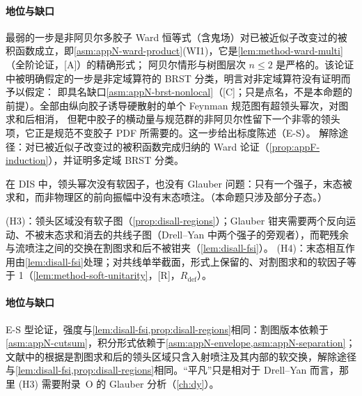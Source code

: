 \paragraph{地位与缺口}
最弱的一步是非阿贝尔多胶子 Ward 恒等式（含鬼场）对已被近似子改变过的被积函数成立，即\cref{asm:appN-ward-product}(WI1)，它是\cref{lem:method-ward-multi}（全阶论证，[A]）的精确形式；
阿贝尔情形与树图层次 $n\le2$ 是严格的。该论证中被明确假定的一步是非定域算符的 BRST 分类，\cite[第~11.3.2~节，第~407--410~页]{Collins2011}明言对非定域算符没有证明而予以假定：
即具名缺口\cref{asm:appN-brst-nonlocal}（[C]；只是点名，不是本命题的前提）。全部由纵向胶子诱导硬散射的单个 Feynman 规范图有超领头幂次，对图求和后相消，
但靶中胶子的横动量与规范群的非阿贝尔性留下一个非零的领头项，它正是规范不变胶子 PDF 所需要的\cite{Collins:2008sg}。这一步给出标度陈述（E-S）。
解除途径：对已被近似子改变过的被积函数完成归纳的 Ward 论证（\cref{prop:appF-induction}），并证明多定域 BRST 分类。

\begin{proposition}\label{prop:disall-h3h4}
在 DIS 中，领头幂次没有软因子，也没有 Glauber 问题：只有一个强子，末态被求和，而非物理区的前向振幅中没有末态喷注。（本命题只涉及部分子态。）
\end{proposition}

\begin{proofsketch}
(H3)：领头区域没有软子图（\cref{prop:disall-regions}）；Glauber 钳夹需要两个反向运动、不被末态求和消去的共线子图（Drell--Yan 中两个强子的旁观者），而靶残余与流喷注之间的交换在割图求和后不被钳夹（\cref{lem:disall-fsi}）。
(H4)：末态相互作用由\cref{lem:disall-fsi}处理；对共线单举截面，形式上保留的、对割图求和的软因子等于 1（\cref{lem:method-soft-unitarity}，[R]，$R_{\mathrm{def}}$）。
\end{proofsketch}

\paragraph{地位与缺口}
E-S 型论证，强度与\cref{lem:disall-fsi,prop:disall-regions}相同：割图版本依赖于\cref{asm:appN-cutsum}，积分形式依赖于\cref{asm:appN-envelope,asm:appN-separation}；
文献中的根据是割图求和后的领头区域只含入射喷注及其内部的软交换\cite[第~8.7~节]{CollinsSoperSterman1989}，解除途径与\cref{lem:disall-fsi,prop:disall-regions}相同。“平凡”只是相对于 Drell--Yan 而言，那里 (H3) 需要附录~O 的 Glauber 分析（\cref{ch:dy}）。

